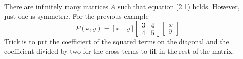 There are infinitely many matrices $A$ such that equation (2.1) holds. However, just one is symmetric. For the previous example
\begin{equation*}
    P(x,y) = [x\quad y]\left[
        \begin{array}{cc}
            3 & 4\\
            4 & 5
        \end{array}
    \right]
    \left[\begin{array}{c}
        x\\
        y
    \end{array}\right]
\end{equation*}
Trick is to put the coefficient of the squared terms on the diagonal and the coefficient divided by two for the cross terms to fill in the rest of the matrix.

